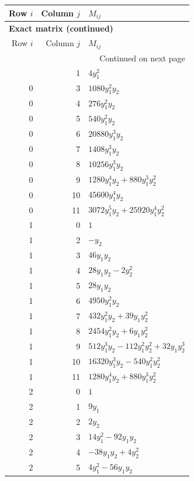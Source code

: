 \documentclass[10pt,a4paper]{article}
\begin{document}
{\small\setlength{\tabcolsep}{7pt}\begin{longtable}{rrp{125mm}}
\toprule Row $i$ & Column $j$ & $M_{ij}$\\\midrule\endfirsthead
\multicolumn{3}{l}{\textbf{Exact matrix (continued)}}\\
\toprule Row $i$ & Column $j$ & $M_{ij}$\\\midrule\endhead
\midrule\multicolumn{3}{r}{Continued on next page}\\\endfoot\bottomrule\endlastfoot
0 & 1 & $4 y_{1}^{2}$\\
0 & 3 & $1080 y_{1}^{2} y_{2}$\\
0 & 4 & $276 y_{1}^{2} y_{2}$\\
0 & 5 & $540 y_{1}^{2} y_{2}$\\
0 & 6 & $20880 y_{1}^{3} y_{2}$\\
0 & 7 & $1408 y_{1}^{3} y_{2}$\\
0 & 8 & $10256 y_{1}^{3} y_{2}$\\
0 & 9 & $1280 y_{1}^{4} y_{2} + 880 y_{1}^{3} y_{2}^{2}$\\
0 & 10 & $45600 y_{1}^{4} y_{2}$\\
0 & 11 & $3072 y_{1}^{5} y_{2} + 25920 y_{1}^{4} y_{2}^{2}$\\
1 & 0 & $1$\\
1 & 2 & $- y_{2}$\\
1 & 3 & $46 y_{1} y_{2}$\\
1 & 4 & $28 y_{1} y_{2} - 2 y_{2}^{2}$\\
1 & 5 & $28 y_{1} y_{2}$\\
1 & 6 & $4950 y_{1}^{2} y_{2}$\\
1 & 7 & $432 y_{1}^{2} y_{2} + 39 y_{1} y_{2}^{2}$\\
1 & 8 & $2454 y_{1}^{2} y_{2} + 6 y_{1} y_{2}^{2}$\\
1 & 9 & $512 y_{1}^{3} y_{2} - 112 y_{1}^{2} y_{2}^{2} + 32 y_{1} y_{2}^{3}$\\
1 & 10 & $16320 y_{1}^{3} y_{2} - 540 y_{1}^{2} y_{2}^{2}$\\
1 & 11 & $1280 y_{1}^{4} y_{2} + 880 y_{1}^{3} y_{2}^{2}$\\
2 & 0 & $1$\\
2 & 1 & $9 y_{1}$\\
2 & 2 & $2 y_{2}$\\
2 & 3 & $14 y_{1}^{2} - 92 y_{1} y_{2}$\\
2 & 4 & $- 38 y_{1} y_{2} + 4 y_{2}^{2}$\\
2 & 5 & $4 y_{1}^{2} - 56 y_{1} y_{2}$\\

\end{longtable}}
\end{document}
